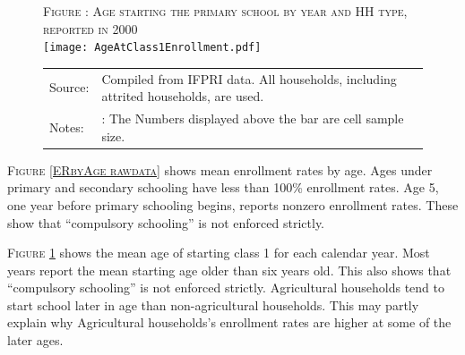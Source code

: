 \documentclass[12pt,letterpaper]{article}
\newcommand{\0}{\ensuremath{\mbox{\boldmath $0$}}}
\begin{document}
{\begin{figure}[h!]
\hfil\textsc{\footnotesize Figure \thefigure: Age starting the primary school by year and HH type, reported in 2000\label{AgeAtClass1byAge rawdata}}\\
\hfil \texttt{[image: AgeAtClass1Enrollment.pdf]}\\
\renewcommand{\arraystretch}{1}
\hfil\begin{tabular}{>{\hfill\scriptsize}p{1cm}<{}>{\scriptsize}p{12cm}<{\hfill}}
Source:& Compiled from IFPRI data. All households, including attrited households, are used.\\[-1ex]
Notes:&: The Numbers displayed above the bar are cell sample size. \\[-1ex]
\end{tabular}
\end{figure}

\textsc{\footnotesize Figure \ref{ERbyAge rawdata}} shows mean enrollment rates by age. Ages under primary and secondary schooling have less than 100\% enrollment rates. Age 5, one year before primary schooling begins, reports nonzero enrollment rates. These show that ``compulsory schooling'' is not enforced strictly. 

\textsc{\footnotesize Figure \ref{AgeAtClass1byAge rawdata}} shows the mean age of starting class 1 for each calendar year. Most years report the mean starting age older than six years old. This also shows that ``compulsory schooling'' is not enforced strictly. Agricultural households tend to start school later in age than non-agricultural households. This may partly explain why Agricultural households's enrollment rates are higher at some of the later ages. 




}
\end{document}
